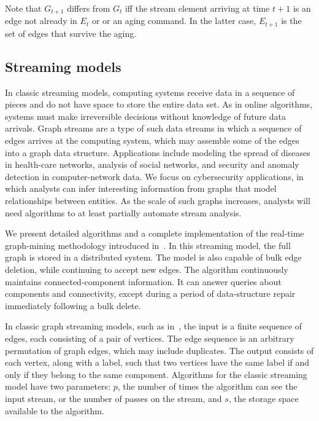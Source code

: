 Note that $G_{t+1}$ differs from $G_t$ iff the stream element arriving at
time $t+1$ is an edge not already in $E_t$ or or an aging command.  In the
latter case, $E_{t+1}$ is the set of edges that survive the aging.

\noindent



\subsection{Streaming models}
In classic streaming models, computing systems receive data in a sequence of pieces and do not have space to store the entire data set. As in online algorithms, systems must make irreversible decisions without knowledge of future data arrivals. Graph streams are a type of such data streams in which a sequence of edges arrives at the computing system, which may assemble some of the edges into a graph data structure. Applications include modeling the spread of diseases in health-care networks, analysis of social networks, and security and anomaly detection in computer-network data. We focus on cybersecurity applications, in which analysts can infer interesting information from graphs that model relationships between entities. As the scale of such graphs increases, analysts will need algorithms to at least partially automate stream analysis.

We present detailed algorithms and a complete implementation of the real-time graph-mining methodology introduced in~\cite{AMP:berry2013maintaining}. In this streaming model, the full graph is stored in a distributed system. The model is also capable of bulk edge deletion, while continuing to accept new edges. The algorithm continuously maintains connected-component information.  It can answer queries about components and connectivity, except during a period of data-structure repair immediately following a bulk delete.

In classic graph streaming models, such as in~\cite{AMP:munro1980selection,AMP:muthukrishnan2005data,AMP:raghavan1999computing}, the input is a finite sequence of edges, each consisting of a pair of vertices. The edge sequence is an arbitrary permutation of graph edges, which may include duplicates. The output consists of each vertex, along with a label, such that two vertices have the same label if and only if they belong to the same component. Algorithms for the classic streaming model have two parameters: $p$, the number of times the algorithm can see the input stream, or the number of passes on the stream, and $s$, the storage space available to the algorithm. 

